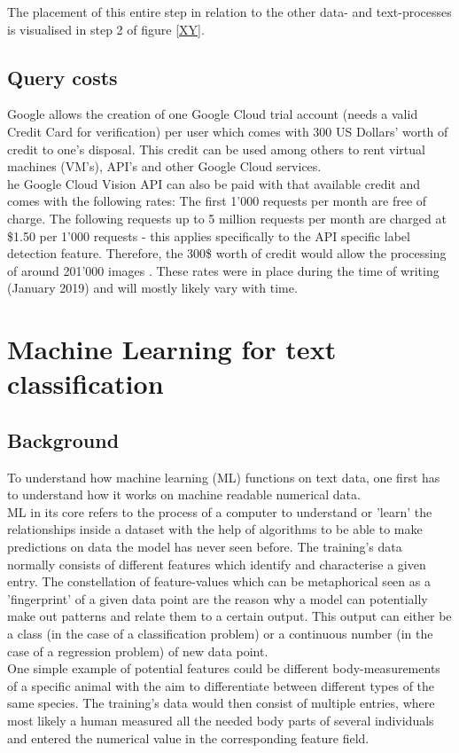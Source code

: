 The placement of this entire step in relation to the other data- and text-processes is visualised in step 2 of figure \ref{XY}.

\subsection{Query costs} \label{vision_query_cost}
Google allows the creation of one Google Cloud trial account (needs a valid Credit Card for verification) per user which comes with 300 US Dollars' worth of credit to one's disposal. This credit can be used among others to rent virtual machines (VM's), API's and other Google Cloud services.\\
\newline
he Google Cloud Vision API can also be paid with that available credit and comes with the following rates: The first 1'000 requests per month are free of charge. The following requests up to 5 million requests per month are charged at \$1.50 per 1'000 requests - this applies specifically to the API specific label detection feature. Therefore, the 300\$ worth of credit would allow the processing of around 201'000 images \parencite{GoogleIn.2019}. These rates were in place during the time of writing (January 2019) and will mostly likely vary with time.

\section{Machine Learning for text classification} 
\subsection{Background}
To understand how machine learning (ML) functions on text data, one first has to understand how it works on machine readable numerical data.\\
ML in its core refers to the process of a computer to understand or 'learn' the relationships inside a dataset with the help of algorithms to be able to make predictions on data the model has never seen before. The training's data normally consists of different features which identify and characterise a given entry. The constellation of feature-values which can be metaphorical seen as a 'fingerprint' of a given data point are the reason why a model can potentially make out patterns and relate them to a certain output. This output can either be a class (in the case of a classification problem) or a continuous number (in the case of a regression problem) of new data point.\\
\newline
One simple example of potential features could be different body-measurements of a specific animal with the aim to differentiate between different types of the same species. The training's data would then consist of multiple entries, where most likely a human measured all the needed body parts of several individuals and entered the numerical value in the corresponding feature field.\\

